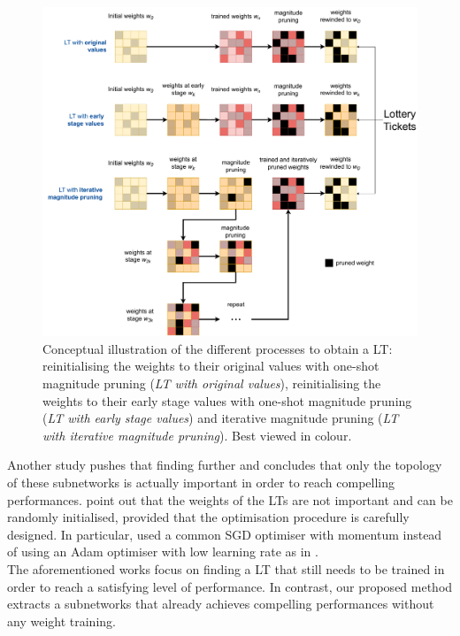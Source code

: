 \begin{figure}[htbp]
  \centering
  \includegraphics[width=\textwidth]{chapter_2/assets/LT_schemes.pdf}
  \caption{Conceptual illustration of the different processes to obtain a
  \acl{LT}: reinitialising the weights to their original values with one-shot
  magnitude pruning (\emph{LT with original values}), reinitialising the weights
  to their early stage values with one-shot magnitude pruning (\emph{LT with
  early stage values}) and iterative magnitude pruning (\emph{LT with iterative
  magnitude pruning}). Best viewed in colour.}
  \label{fig:chap2:lt_schemes}
\end{figure}

Another study \cite{DBLP:conf/iclr/LiuSZHD19} pushes that finding further and
concludes that only the topology of these subnetworks is actually important in
order to reach compelling performances. \citeauthor{DBLP:conf/iclr/LiuSZHD19}
\cite{DBLP:conf/iclr/LiuSZHD19} point out that the weights of the \acp{LT} are
not important and can be randomly initialised, provided that the optimisation
procedure is carefully designed. In particular,
\citeauthor{DBLP:conf/iclr/LiuSZHD19} used a common \ac{SGD} optimiser with
momentum instead of using an Adam optimiser \cite{kingma2014adam} with low
learning rate as in \cite{DBLP:conf/iclr/FrankleC19}. \\

The aforementioned works
\cite{DBLP:conf/iclr/FrankleC19,DBLP:conf/icml/FrankleD0C20,DBLP:conf/iclr/LiuSZHD19}
focus on finding a \acl{LT} that still needs to be trained in order to reach a
satisfying level of performance. In contrast, our proposed method extracts a
subnetworks that already achieves compelling performances without any weight
training.\\ 


